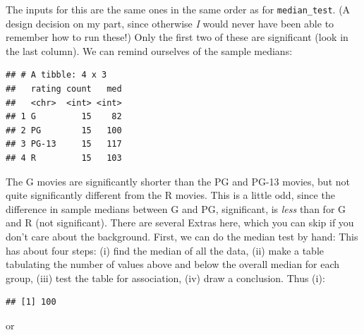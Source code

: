 \documentclass[]{tufte-book}
\newenvironment{Shaded}{}{}
\newcommand{\DataTypeTok}[1]{\textcolor[rgb]{0.56,0.13,0.00}{#1}}
\newcommand{\KeywordTok}[1]{\textcolor[rgb]{0.00,0.44,0.13}{\textbf{#1}}}
\newcommand{\NormalTok}[1]{#1}
\newcommand{\OperatorTok}[1]{\textcolor[rgb]{0.40,0.40,0.40}{#1}}
\newcommand{\StringTok}[1]{\textcolor[rgb]{0.25,0.44,0.63}{#1}}
\theoremstyle{definition}
\theoremstyle{definition}
\theoremstyle{definition}
\theoremstyle{remark}
\begin{document}
The inputs for this are the same ones in the same order as for
\texttt{median\_test}. (A design decision on my part, since otherwise
\emph{I} would never have been able to remember how to run these!) Only
the first two of these are significant (look in the last column). We can
remind ourselves of the sample medians:

\begin{Shaded}
\end{Shaded}

\begin{verbatim}
## # A tibble: 4 x 3
##   rating count   med
##   <chr>  <int> <int>
## 1 G         15    82
## 2 PG        15   100
## 3 PG-13     15   117
## 4 R         15   103
\end{verbatim}

The G movies are significantly shorter than the PG and PG-13 movies, but
not quite significantly different from the R movies. This is a little
odd, since the difference in sample medians between G and PG,
significant, is \emph{less} than for G and R (not significant). There
are several Extras here, which you can skip if you don't care about the
background. First, we can do the median test by hand: This has about
four steps: (i) find the median of all the data, (ii) make a table
tabulating the number of values above and below the overall median for
each group, (iii) test the table for association, (iv) draw a
conclusion. Thus (i):

\begin{Shaded}
\end{Shaded}

\begin{verbatim}
## [1] 100
\end{verbatim}

or

\begin{Shaded}
\end{Shaded}
\end{document}
